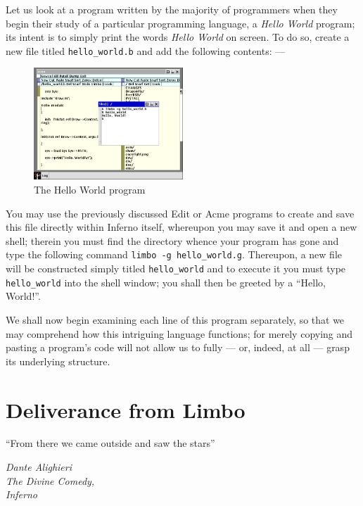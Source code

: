 \documentclass[a5paper,twoside,12pt]{report}
\begin{document}
Let us look at a program written by the majority of programmers when they begin their study of a particular programming language, a \textit{Hello World} program; its intent is to simply print the words \textit{Hello World} on screen. To do so, create a new file titled \texttt{hello\_world.b} and add the following contents: —
\label{hello-world}

  \begin{figure}
    \centering
    \includegraphics[width=0.5\textwidth]{imgs/hello-world.png}
    \caption{The Hello World program}
  \end{figure}

You may use the previously discussed Edit or Acme programs to create and save this file directly within Inferno itself, whereupon you may save it and open a new shell; therein you must find the directory whence your program has gone and type the following command \texttt{limbo -g hello\_world.g}. Thereupon, a new file will be constructed simply titled \texttt{hello\_world} and to execute it you must type \texttt{hello\_world} into the shell window; you shall then be greeted by a ``Hello, World!''.

We shall now begin examining each line of this program separately, so that we may comprehend how this intriguing language functions; for merely copying and pasting a program's code will not allow us to fully — or, indeed, at all — grasp its underlying structure.\newpage

\chapter*{Deliverance from Limbo}
\epigraph{``From there we came outside and saw the stars''}{\textit{Dante Alighieri\\The Divine Comedy, \\Inferno}}
\end{document}
